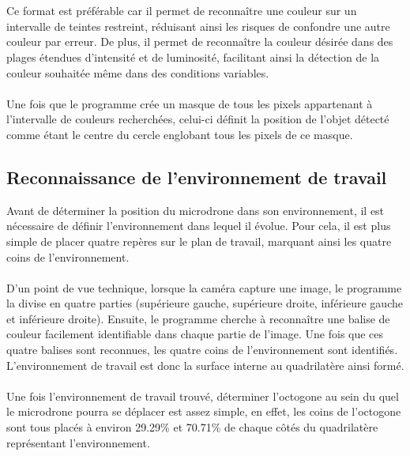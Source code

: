 \documentclass{article}
\begin{document}
        \\\\
       Ce format est préférable car il permet de reconnaître une couleur sur un intervalle de teintes restreint, réduisant ainsi les risques de confondre une autre couleur par erreur. De plus, il permet de reconnaître la couleur désirée dans des plages étendues d'intensité et de luminosité, facilitant ainsi la détection de la couleur souhaitée même dans des conditions variables.
        \\\\
        Une fois que le programme crée un masque de tous les pixels appartenant à l'intervalle de couleurs recherchées, celui-ci définit la position de l'objet détecté comme étant le centre du cercle englobant tous les pixels de ce masque.
    
    \subsection{Reconnaissance de l'environnement de travail}
Avant de déterminer la position du microdrone dans son environnement, il est nécessaire de définir l'environnement dans lequel il évolue. Pour cela, il est plus simple de placer quatre repères sur le plan de travail, marquant ainsi les quatre coins de l'environnement.
\\\\
D'un point de vue technique, lorsque la caméra capture une image, le programme la divise en quatre parties (supérieure gauche, supérieure droite, inférieure gauche et inférieure droite). Ensuite, le programme cherche à reconnaître une balise de couleur facilement identifiable dans chaque partie de l'image. Une fois que ces quatre balises sont reconnues, les quatre coins de l'environnement sont identifiés. L'environnement de travail est donc la surface interne au quadrilatère ainsi formé.
        \\\\
        Une fois l'environnement de travail trouvé, déterminer l'octogone au sein du quel le microdrone pourra se déplacer est assez simple, en effet, les coins de l'octogone sont tous placés à environ 29.29\% et 70.71\% de chaque côtés du quadrilatère représentant l'environnement.
\end{document}
